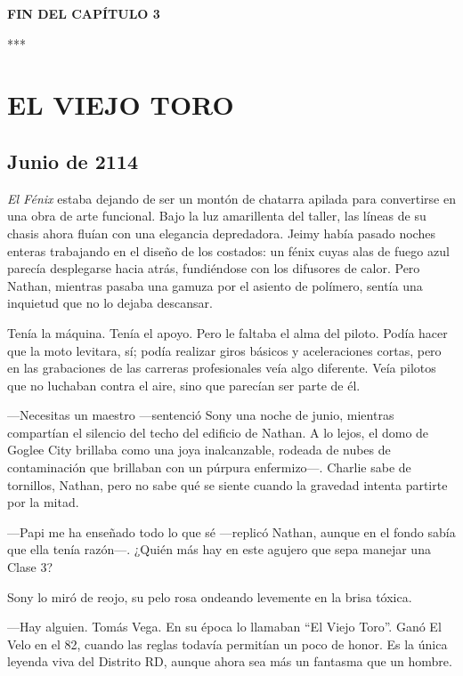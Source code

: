 \documentclass[11pt,twoside]{book}
\begin{document}
\textbf{FIN DEL CAPÍTULO 3}


\bigskip
\begin{center}***\end{center}
\bigskip

\chapter{EL VIEJO TORO}

\section*{Junio de 2114}

\textit{El Fénix} estaba dejando de ser un montón de chatarra apilada para convertirse en una obra de arte funcional. Bajo la luz amarillenta del taller, las líneas de su chasis ahora fluían con una elegancia depredadora. Jeimy había pasado noches enteras trabajando en el diseño de los costados: un fénix cuyas alas de fuego azul parecía desplegarse hacia atrás, fundiéndose con los difusores de calor. Pero Nathan, mientras pasaba una gamuza por el asiento de polímero, sentía una inquietud que no lo dejaba descansar.

Tenía la máquina. Tenía el apoyo. Pero le faltaba el alma del piloto. Podía hacer que la moto levitara, sí; podía realizar giros básicos y aceleraciones cortas, pero en las grabaciones de las carreras profesionales veía algo diferente. Veía pilotos que no luchaban contra el aire, sino que parecían ser parte de él.

---Necesitas un maestro ---sentenció Sony una noche de junio, mientras compartían el silencio del techo del edificio de Nathan. A lo lejos, el domo de Goglee City brillaba como una joya inalcanzable, rodeada de nubes de contaminación que brillaban con un púrpura enfermizo---. Charlie sabe de tornillos, Nathan, pero no sabe qué se siente cuando la gravedad intenta partirte por la mitad.

---Papi me ha enseñado todo lo que sé ---replicó Nathan, aunque en el fondo sabía que ella tenía razón---. ¿Quién más hay en este agujero que sepa manejar una Clase 3?

Sony lo miró de reojo, su pelo rosa ondeando levemente en la brisa tóxica.

---Hay alguien. Tomás Vega. En su época lo llamaban ``El Viejo Toro''. Ganó El Velo en el 82, cuando las reglas todavía permitían un poco de honor. Es la única leyenda viva del Distrito RD, aunque ahora sea más un fantasma que un hombre.
\end{document}
